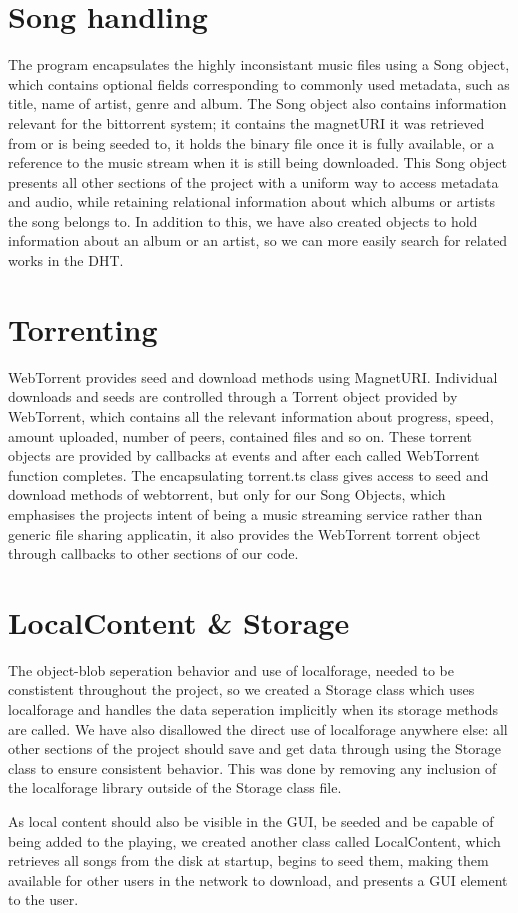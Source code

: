 \section{Song handling}
The program encapsulates the highly inconsistant music files using a Song object,
which contains optional fields corresponding to commonly used metadata, 
such as title, name of artist, genre and album. 
The Song object also contains information relevant for the bittorrent system; 
it contains the magnetURI it was retrieved from or is being seeded to, 
it holds the binary file once it is fully available, 
or a reference to the music stream when it is still being downloaded.
This Song object presents all other sections of the project with a uniform way to access metadata and audio, 
while retaining relational information about which albums or artists the song belongs to. In addition to this, 
we have also created objects to hold information about an album or an artist, 
so we can more easily search for related works in the \acs{DHT}.
\newline

\section{Torrenting}
WebTorrent provides seed and download methods using MagnetURI.
Individual downloads and seeds are controlled through a Torrent object provided by WebTorrent,
which contains all the relevant information about progress, 
speed, amount uploaded, number of peers, contained files and so on.
These torrent objects are provided by callbacks at events
and after each called WebTorrent function completes.
The encapsulating torrent.ts class gives access to seed and download methods of webtorrent, 
but only for our Song Objects, which emphasises the projects intent of being a music streaming service 
rather than generic file sharing applicatin, 
it also provides the WebTorrent torrent object through callbacks to other sections of our code.
\newline

\section{LocalContent \& Storage}
The object-blob seperation behavior and use of localforage,
needed to be constistent throughout the project, 
so we created a Storage class which uses localforage and handles the data seperation implicitly when its storage methods are called.
We have also disallowed the direct use of localforage anywhere else:
all other sections of the project should save and get data through using the Storage class to ensure consistent behavior. 
This was done by removing any inclusion of the localforage library outside of the Storage class file.

As local content should also be visible in the \acs{GUI}, 
be seeded and be capable of being added to the playing,
we created another class called LocalContent,
which retrieves all songs from the disk at startup,
begins to seed them, making them available for other users in the network to download,
and presents a \acs{GUI} element to the user.
